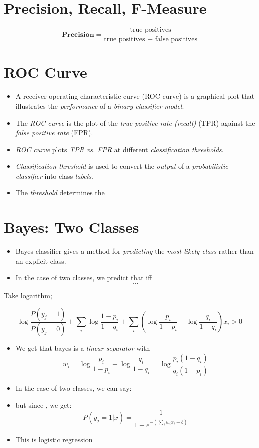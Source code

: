 \documentclass[
	number={3},
	title={Na\"{\i}ive Bayes Learning}
]{cs584notes}
\begin{document}
\section{Precision, Recall, F-Measure}\label{sec:precision-recall-f-measure}
\begin{equation}
	\mathbf{Precision} = \frac{\mbox{true positives}}{\mbox{true positives } + \mbox{ false positives}}
	\label{eq:precision}
\end{equation}

\section{ROC Curve}\label{sec:roc-curve}
\begin{itemize}
	\item A receiver operating characteristic curve (ROC curve) is a graphical plot that illustrates the \emph{performance} of a \emph{binary classifier model}.
	\item The \emph{ROC curve} is the plot of the \emph{true positive rate (recall)} (TPR) against the \emph{false positive rate} (FPR).
	\item \emph{ROC curve} plots \emph{TPR vs. FPR} at different \emph{classification thresholds}.
	\item \emph{Classification threshold} is used to convert the \emph{output} of a \emph{probabilistic classifier} into class \emph{labels}.
	\item The \emph{threshold} determines the
\end{itemize}

\section{\naive Bayes: Two Classes}\label{sec:naive-bayes:-two-classes}
\begin{itemize}
	\item \naive Bayes classifier gives a method for \emph{predicting} the \emph{most likely class} rather than an explicit class.
	\item In the case of two classes,  we predict that  iff
	\[ \dots \]
\end{itemize}

Take logarithm;

\[ \log \frac{P(y_{j}=1)}{P(y_{j}=0)} + \sum_{i}\log \frac{1-p_{i}}{1-q_{i}} + \sum_{i}\left( \log\frac{p_{i}}{1-p_{i}} - \log\frac{q_{i}}{1-q_{i}} \right)x_{i} > 0 \]
\begin{itemize}
	\item We get that \naive bayes is a \emph{linear separator} with --
	\[ w_{i} = \log\frac{p_{i}}{1 - p_{i}} - \log\frac{q_{i}}{1 - q_{i}} = \log\frac{p_{i}(1-q_{i})}{q_{i}(1-p_{i})} \]
	\item In the case of two classes, we can say:
	\item but since , we get:
	\[ P(y_{j}=1|x) = \frac{1}{1+e^{-\left( \sum_{i}w_{i}x_{i} + b \right)}} \]
	\item This is logistic regression
\end{itemize}
\end{document}
